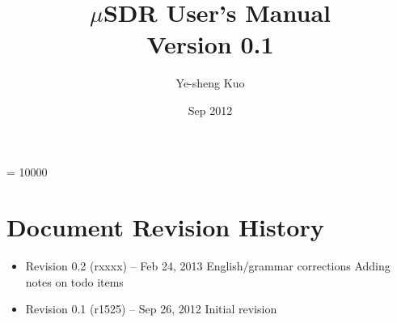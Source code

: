 \documentclass[10pt]{report}
\newcommand{\sdr}{$\mu$SDR\xspace}
\begin{document}
\widowpenalty = 10000

\title{\sdr User's Manual\\ Version 0.1}
\author{Ye-sheng Kuo}
\date{Sep 2012}
\maketitle
\tableofcontents





\vfill\eject



\clearpage
\section{Document Revision History}
\label{sec:revisions}

\begin{itemize}

\item Revision 0.2 {\footnotesize(rxxxx)} -- Feb 24, 2013
\subitem English/grammar corrections
\subitem Adding notes on todo items

\item Revision 0.1 {\footnotesize(r1525)} -- Sep 26, 2012
\subitem Initial revision

\end{itemize}


\vfill\eject


{%
\raggedright


}
\end{document}
